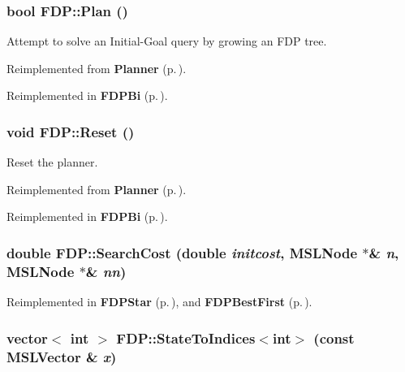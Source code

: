 \subsubsection{\setlength{\rightskip}{0pt plus 5cm}bool FDP::Plan ()\hspace{0.3cm}{\tt  [virtual]}}\label{classFDP_a3}


Attempt to solve an Initial-Goal query by growing an FDP tree.



Reimplemented from {\bf Planner} {\rm (p.\,\pageref{classPlanner_a4})}.

Reimplemented in {\bf FDPBi} {\rm (p.\,\pageref{classFDPBi_a3})}.
\subsubsection{\setlength{\rightskip}{0pt plus 5cm}void FDP::Reset ()\hspace{0.3cm}{\tt  [virtual]}}\label{classFDP_a2}


Reset the planner.



Reimplemented from {\bf Planner} {\rm (p.\,\pageref{classPlanner_a2})}.

Reimplemented in {\bf FDPBi} {\rm (p.\,\pageref{classFDPBi_a2})}.
\subsubsection{\setlength{\rightskip}{0pt plus 5cm}double FDP::Search\-Cost (double {\em initcost}, {\bf MSLNode} $\ast$\& {\em n}, {\bf MSLNode} $\ast$\& {\em nn})\hspace{0.3cm}{\tt  [protected, virtual]}}\label{classFDP_b0}




Reimplemented in {\bf FDPStar} {\rm (p.\,\pageref{classFDPStar_b0})}, and {\bf FDPBest\-First} {\rm (p.\,\pageref{classFDPBestFirst_b0})}.
\subsubsection{\setlength{\rightskip}{0pt plus 5cm}vector$<$ int $>$ FDP::State\-To\-Indices$<$int$>$ (const {\bf MSLVector} \& {\em x})\hspace{0.3cm}{\tt  [protected, virtual]}}\label{classFDP_b1}




